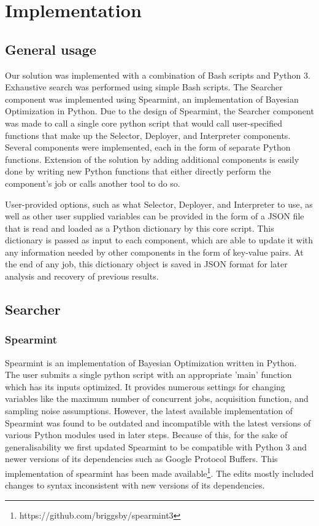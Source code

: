 \documentclass{report}
\begin{document}
\chapter{Implementation}
\section{General usage}
Our solution was implemented with a combination of Bash scripts and Python 3. Exhaustive search was performed using simple Bash scripts. The Searcher component was implemented using Spearmint\cite{Snoek2012}, an implementation of Bayesian Optimization in Python. Due to the design of Spearmint, the Searcher component was made to call a single core python script that would call user-specified functions that make up the Selector, Deployer, and Interpreter components. Several components were implemented, each in the form of separate Python functions. Extension of the solution by adding additional components is easily done by writing new Python functions that either directly perform the component's job or calls another tool to do so.

User-provided options, such as what Selector, Deployer, and Interpreter to use, as well as other user supplied variables can be provided in the form of a JSON file that is read and loaded as a Python dictionary by this core script. This dictionary is passed as input to each component, which are able to update it with any information needed by other components in the form of key-value pairs. At the end of any job, this dictionary object is saved in JSON format for later analysis and recovery of previous results.

\section{Searcher}
\subsection{Spearmint}
Spearmint is an implementation of Bayesian Optimization written in Python. The user submits a single python script with an appropriate 'main' function which has its inputs optimized. It provides numerous settings for changing variables like the maximum number of concurrent jobs, acquisition function, and sampling noise assumptions. However, the latest available implementation of Spearmint was found to be outdated and incompatible with the latest versions of various Python modules used in later steps. 
Because of this, for the sake of generalisability we first updated Spearmint to be compatible with Python 3 and newer versions of its dependencies such as Google Protocol Buffers. This implementation of spearmint has been made available\footnote{https://github.com/briggsby/spearmint3}. The edits mostly included changes to syntax inconsistent with new versions of its dependencies.
\end{document}
